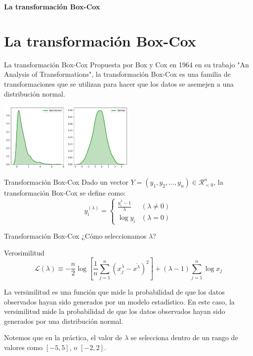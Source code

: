 \documentclass{beamer}
\begin{document}
\begin{frame}
    \begin{center}
        {\LARGE\bf La transformación Box-Cox}
    \end{center}
\end{frame}

\section{La transformación Box-Cox}

\begin{frame}{La transformación Box-Cox}
    Propuesta por Box y Cox en 1964 en su trabajo "An Analysis of Transformations", la transformación Box-Cox es una familia de transformaciones que se utilizan para hacer que los datos se asemejen a una distribución normal.
    \begin{center}
        \includegraphics[width=0.5\textwidth]{output275.png}
    \end{center}
    \begin{block}{Transformación Box-Cox}
        Dado un vector $Y=(y_1, y_2, ..., y_n)\in\mathcal{R}_{<0}^n$, la transformación Box-Cox se define como:
        \begin{equation}
            y_i^{(\lambda)}= \begin{cases}\frac{y_i^{\lambda}-1}{\lambda} & (\lambda \neq 0) \\ \log y_i & (\lambda=0)\end{cases}
        \end{equation}
    \end{block}
\end{frame}
\begin{frame}{Transformación Box-Cox}
    ¿Cómo seleccionamos $\lambda$?
    \begin{block}{Verosimilitud}
        \begin{equation*}
            \mathcal{L}(\lambda) \equiv-\frac{n}{2} \log \left[\frac{1}{n} \sum_{j=1}^{n}\left(x_{j}^{\lambda}-\overline{x^{\lambda}}\right)^{2}\right] +(\lambda-1) \sum_{j=1}^{n} \log x_{j}
        \end{equation*}
    \end{block}
    La versimilitud es una función que mide la probabilidad de que los datos observados hayan sido generados por un modelo estadístico. En este caso, la versimilitud mide la probabilidad de que los datos observados hayan sido generados por una distribución normal.

    Notemos que en la práctica, el valor de $\lambda$ se selecciona dentro de un rango de valores como $[-5, 5]$, o $[-2, 2]$.
\end{frame}
\end{document}
